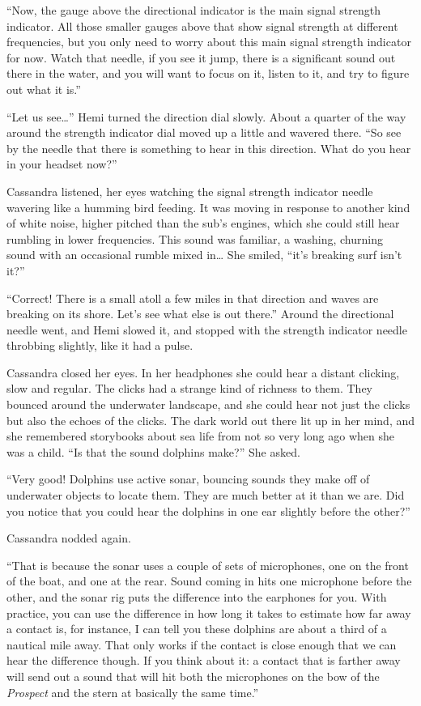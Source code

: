 \documentclass[
]{scrbook}
\begin{document}
``Now, the gauge above the directional indicator is the main signal
strength indicator. All those smaller gauges above that show signal
strength at different frequencies, but you only need to worry about this
main signal strength indicator for now. Watch that needle, if you see it
jump, there is a significant sound out there in the water, and you will
want to focus on it, listen to it, and try to figure out what it is.''

``Let us see\ldots{}'' Hemi turned the direction dial slowly. About a
quarter of the way around the strength indicator dial moved up a little
and wavered there. ``So see by the needle that there is something to
hear in this direction. What do you hear in your headset now?''

Cassandra listened, her eyes watching the signal strength indicator
needle wavering like a humming bird feeding. It was moving in response
to another kind of white noise, higher pitched than the sub's engines,
which she could still hear rumbling in lower frequencies. This sound was
familiar, a washing, churning sound with an occasional rumble mixed
in\ldots{} She smiled, ``it's breaking surf isn't it?''

``Correct! There is a small atoll a few miles in that direction and
waves are breaking on its shore. Let's see what else is out there.''
Around the directional needle went, and Hemi slowed it, and stopped with
the strength indicator needle throbbing slightly, like it had a pulse.

Cassandra closed her eyes. In her headphones she could hear a distant
clicking, slow and regular. The clicks had a strange kind of richness to
them. They bounced around the underwater landscape, and she could hear
not just the clicks but also the echoes of the clicks. The dark world
out there lit up in her mind, and she remembered storybooks about sea
life from not so very long ago when she was a child. ``Is that the sound
dolphins make?'' She asked.

``Very good! Dolphins use active sonar, bouncing sounds they make off of
underwater objects to locate them. They are much better at it than we
are. Did you notice that you could hear the dolphins in one ear slightly
before the other?''

Cassandra nodded again.

``That is because the sonar uses a couple of sets of microphones, one on
the front of the boat, and one at the rear. Sound coming in hits one
microphone before the other, and the sonar rig puts the difference into
the earphones for you. With practice, you can use the difference in how
long it takes to estimate how far away a contact is, for instance, I can
tell you these dolphins are about a third of a nautical mile away. That
only works if the contact is close enough that we can hear the
difference though. If you think about it: a contact that is farther away
will send out a sound that will hit both the microphones on the bow of
the \emph{Prospect} and the stern at basically the same time.''
\end{document}
